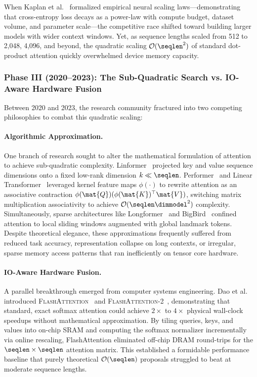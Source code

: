 When Kaplan et al.~\cite{kaplan2020scaling} formalized empirical neural scaling laws—demonstrating that cross-entropy loss decays as a power-law with compute budget, dataset volume, and parameter scale—the competitive race shifted toward building larger models with wider context windows.
Yet, as sequence lengths scaled from 512 to 2,048, 4,096, and beyond, the quadratic scaling $\mathcal{O}(\seqlen^2)$ of standard dot-product attention quickly overwhelmed device memory capacity.

\subsubsection{Phase III (2020–2023): The Sub-Quadratic Search vs. IO-Aware Hardware Fusion}
\label{subsubsec:phase3}

Between 2020 and 2023, the research community fractured into two competing philosophies to combat this quadratic scaling:

\paragraph{Algorithmic Approximation.}
One branch of research sought to alter the mathematical formulation of attention to achieve sub-quadratic complexity.
Linformer~\cite{wang2020linformer} projected key and value sequence dimensions onto a fixed low-rank dimension $k \ll \seqlen$.
Performer~\cite{choromanski2021rethinking} and Linear Transformer~\cite{katharopoulos2020transformers} leveraged kernel feature maps $\phi(\cdot)$ to rewrite attention as an associative contraction $\phi(\mat{Q})(\phi(\mat{K})^\top \mat{V})$, switching matrix multiplication associativity to achieve $\mathcal{O}(\seqlen \dimmodel^2)$ complexity.
Simultaneously, sparse architectures like Longformer~\cite{beltagy2020longformer} and BigBird~\cite{zaheer2020bigbird} confined attention to local sliding windows augmented with global landmark tokens.
Despite theoretical elegance, these approximations frequently suffered from reduced task accuracy, representation collapse on long contexts, or irregular, sparse memory access patterns that ran inefficiently on tensor core hardware.

\paragraph{IO-Aware Hardware Fusion.}
A parallel breakthrough emerged from computer systems engineering.
Dao et al. introduced \textsc{FlashAttention}~\cite{dao2022flashattention} and \textsc{FlashAttention-2}~\cite{dao2023flashattention2}, demonstrating that standard, exact softmax attention could achieve $2\times$ to $4\times$ physical wall-clock speedups without mathematical approximation.
By tiling queries, keys, and values into on-chip SRAM and computing the softmax normalizer incrementally via online rescaling, FlashAttention eliminated off-chip DRAM round-trips for the $\seqlen \times \seqlen$ attention matrix.
This established a formidable performance baseline that purely theoretical $\mathcal{O}(\seqlen)$ proposals struggled to beat at moderate sequence lengths.

